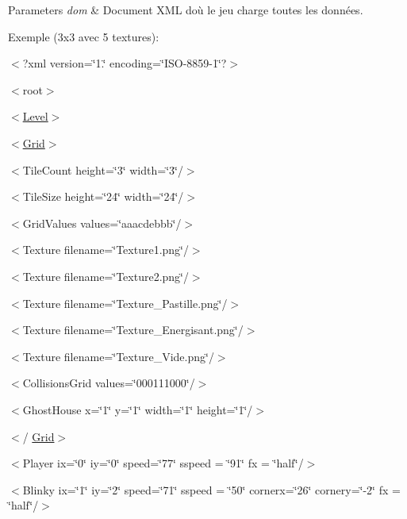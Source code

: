 \begin{DoxyParams}{Parameters}
{\em dom} & Document X\+M\+L d\textquotesingle{}où le jeu charge toutes les données.\\
\hline
\end{DoxyParams}
Exemple (3x3 avec 5 textures)\+:
\begin{DoxyItemize}
\item $<$?xml version=\char`\"{}1.\char`\"{} encoding=\char`\"{}\+I\+S\+O-\/8859-\/1\char`\"{}?$>$
\item $<$root$>$
\begin{DoxyItemize}
\item $<$\hyperlink{class_level}{Level}$>$
\begin{DoxyItemize}
\item $<$\hyperlink{class_grid}{Grid}$>$
\begin{DoxyItemize}
\item $<$Tile\+Count height=\char`\"{}3\char`\"{} width=\char`\"{}3\char`\"{}/$>$
\item $<$Tile\+Size height=\char`\"{}24\char`\"{} width=\char`\"{}24\char`\"{}/$>$
\item $<$Grid\+Values values=\char`\"{}aaacdebbb\char`\"{}/$>$
\item $<$Texture filename=\char`\"{}\+Texture1.\+png\char`\"{}/$>$
\item $<$Texture filename=\char`\"{}\+Texture2.\+png\char`\"{}/$>$
\item $<$Texture filename=\char`\"{}\+Texture\+\_\+\+Pastille.\+png\char`\"{}/$>$
\item $<$Texture filename=\char`\"{}\+Texture\+\_\+\+Energisant.\+png\char`\"{}/$>$
\item $<$Texture filename=\char`\"{}\+Texture\+\_\+\+Vide.\+png\char`\"{}/$>$
\item $<$Collisions\+Grid values=\char`\"{}000111000\char`\"{}/$>$
\item $<$Ghost\+House x=\char`\"{}1\char`\"{} y=\char`\"{}1\char`\"{} width=\char`\"{}1\char`\"{} height=\char`\"{}1\char`\"{}/$>$
\end{DoxyItemize}
\item $<$/ \hyperlink{class_grid}{Grid}$>$
\item $<$Player ix=\char`\"{}0\char`\"{} iy=\char`\"{}0\char`\"{} speed=\char`\"{}77\char`\"{} sspeed = \char`\"{}91\char`\"{} fx = \char`\"{}half\char`\"{}/$>$
\item $<$Blinky ix=\char`\"{}1\char`\"{} iy=\char`\"{}2\char`\"{} speed=\char`\"{}71\char`\"{} sspeed = \char`\"{}50\char`\"{} cornerx=\char`\"{}26\char`\"{} cornery=\char`\"{}-\/2\char`\"{} fx = \char`\"{}half\char`\"{}/$>$

\end{DoxyItemize}
\end{DoxyItemize}
\end{DoxyItemize}
